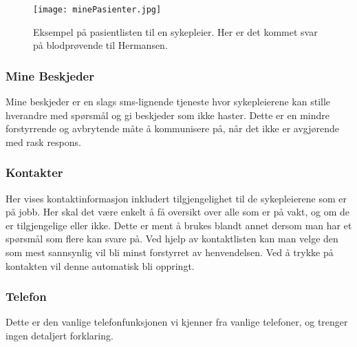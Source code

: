 \begin{figure}[H]
\texttt{[image: minePasienter.jpg]}
\caption{Eksempel på pasientlisten til en sykepleier. Her er det kommet svar på blodprøvende til Hermansen.}
\label{minePasienter}
\end{figure}

\subsubsection{Mine Beskjeder}
Mine beskjeder er en slags sms-lignende tjeneste hvor sykepleierene kan stille hverandre med spørsmål og gi beskjeder som ikke haster. Dette er en mindre forstyrrende og avbrytende måte å kommunisere på, når det ikke er avgjørende med rask respons.

\subsubsection{Kontakter}
Her vises kontaktinformasjon inkludert tilgjengelighet til de sykepleierene som er på jobb. Her skal det være enkelt å få oversikt over alle som er på vakt, og om de er tilgjengelige eller ikke. Dette er ment å brukes blandt annet dersom man har et spørsmål som flere kan svare på. Ved hjelp av kontaktlisten kan man velge den som mest sannsynlig vil bli minst forstyrret av henvendelsen. Ved å trykke på kontakten vil denne automatisk bli oppringt.

\subsubsection{Telefon}
Dette er den vanlige telefonfunksjonen vi kjenner fra vanlige telefoner, og trenger ingen detaljert forklaring.



